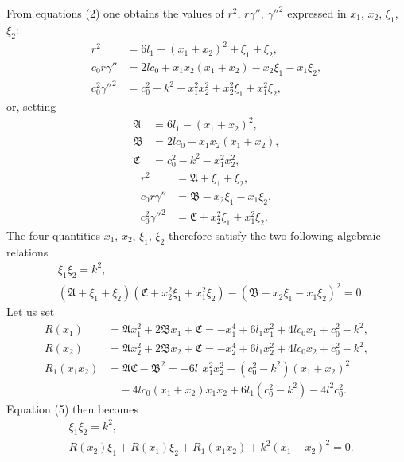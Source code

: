 \documentclass{article}
\begin{document}
From equations (2) one obtains the values of $r^2$, $r\gamma''$, $\gamma''^2$ expressed in $x_1$, $x_2$, $\xi_1$, $\xi_2$:
\begin{equation}
\begin{aligned}
r^2 &= 6l_1 - (x_1 + x_2)^2 + \xi_1 + \xi_2, \\
c_0r\gamma'' &= 2lc_0 + x_1x_2(x_1 + x_2) - x_2\xi_1 - x_1\xi_2, \\
c_0^2\gamma''^2 &= c_0^2 - k^2 - x_1^2x_2^2 + x_2^2\xi_1 + x_1^2\xi_2,
\end{aligned}
\end{equation}
or, setting
\begin{align*}
\mathfrak{A} &= 6l_1 - (x_1 + x_2)^2, \\
\mathfrak{B} &= 2lc_0 + x_1x_2(x_1 + x_2), \\
\mathfrak{C} &= c_0^2 - k^2 - x_1^2x_2^2,
\end{align*}
\begin{equation}
    \tag{4'}
\begin{aligned}
r^2 &= \mathfrak{A} + \xi_1 + \xi_2, \\
c_0r\gamma'' &= \mathfrak{B} - x_2\xi_1 - x_1\xi_2, \\
c_0^2\gamma''^2 &= \mathfrak{C} + x_2^2\xi_1 + x_1^2\xi_2.
\end{aligned}
\end{equation}
The four quantities $x_1$, $x_2$, $\xi_1$, $\xi_2$ therefore satisfy the two following algebraic relations
\begin{equation}
\begin{aligned}
&\xi_1\xi_2 = k^2, \\
&(\mathfrak{A} + \xi_1 + \xi_2)(\mathfrak{C} + x_2^2\xi_1 + x_1^2\xi_2) - (\mathfrak{B} - x_2\xi_1 - x_1\xi_2)^2 = 0.
\end{aligned}
\end{equation}
Let us set
\begin{align*}
R(x_1) &= \mathfrak{A}x_1^2 + 2\mathfrak{B}x_1 + \mathfrak{C} = -x_1^4 + 6l_1x_1^2 + 4lc_0x_1 + c_0^2 - k^2, \\
R(x_2) &= \mathfrak{A}x_2^2 + 2\mathfrak{B}x_2 + \mathfrak{C} = -x_2^4 + 6l_1x_2^2 + 4lc_0x_2 + c_0^2 - k^2, \\
R_1(x_1x_2) &= \mathfrak{A}\mathfrak{C} - \mathfrak{B}^2 = -6l_1x_1^2x_2^2 - (c_0^2 - k^2)(x_1 + x_2)^2 \\
&\quad - 4lc_0(x_1 + x_2)x_1x_2 + 6l_1(c_0^2 - k^2) - 4l^2c_0^2.
\end{align*}
Equation (5) then becomes
\begin{equation}
    \tag{5'}
    \begin{aligned}
    &\xi_1\xi_2 = k^2, \\
    &R(x_2)\xi_1 + R(x_1)\xi_2 + R_1(x_1x_2) + k^2(x_1 - x_2)^2 = 0.
    \end{aligned}
\end{equation}
\end{document}
